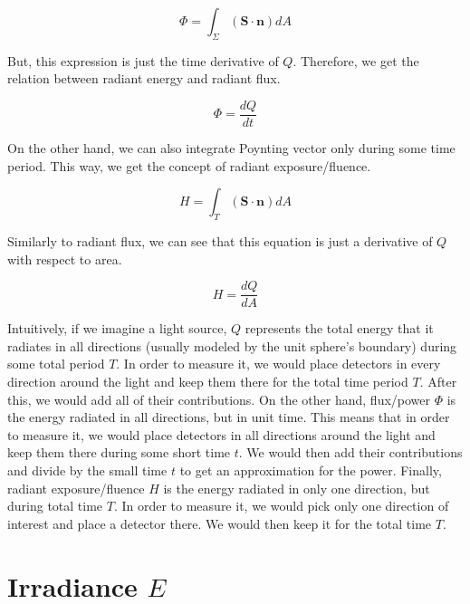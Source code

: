 \documentclass{article}
\begin{document}
\[ \Phi = \int_{\Sigma} (\mathbf{S} \cdot \mathbf{n})dA \]

But, this expression is just the time derivative of $Q$. Therefore, we get the relation between radiant energy and radiant flux.

\[ \Phi = \frac{dQ}{dt} \]

On the other hand, we can also integrate Poynting vector only during some time period. This way, we get the concept of radiant exposure/fluence.

\[ H = \int_{T}(\mathbf{S} \cdot \mathbf{n})dA \]

Similarly to radiant flux, we can see that this equation is just a derivative of $Q$ with respect to area.

\[ H = \frac{dQ}{dA} \]

Intuitively, if we imagine a light source, $Q$ represents the total energy that it radiates in all directions (usually modeled by the unit sphere's boundary) during some total period $T$. In order to measure it, we would place detectors in every direction around the light and keep them there for the total time period $T$. After this, we would add all of their contributions. On the other hand, flux/power $\Phi$ is the energy radiated in all directions, but in unit time. This means that in order to measure it, we would place detectors in all directions around the light and keep them there during some short time $t$. We would then add their contributions and divide by the small time $t$ to get an approximation for the power. Finally, radiant exposure/fluence $H$ is the energy radiated in only one direction, but during total time $T$. In order to measure it, we would pick only one direction of interest and place a detector there. We would then keep it for the total time $T$.



\section{Irradiance $E$}
\end{document}
